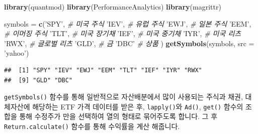 \documentclass[12pt,]{book}
\newenvironment{Shaded}{\begin{snugshade}}{\end{snugshade}}
\newcommand{\CommentTok}[1]{\textcolor[rgb]{0.56,0.35,0.01}{\textit{#1}}}
\newcommand{\ControlFlowTok}[1]{\textcolor[rgb]{0.13,0.29,0.53}{\textbf{#1}}}
\newcommand{\DataTypeTok}[1]{\textcolor[rgb]{0.13,0.29,0.53}{#1}}
\newcommand{\KeywordTok}[1]{\textcolor[rgb]{0.13,0.29,0.53}{\textbf{#1}}}
\newcommand{\NormalTok}[1]{#1}
\newcommand{\OperatorTok}[1]{\textcolor[rgb]{0.81,0.36,0.00}{\textbf{#1}}}
\newcommand{\StringTok}[1]{\textcolor[rgb]{0.31,0.60,0.02}{#1}}
\begin{document}
\begin{Shaded}
\begin{Highlighting}[]
\KeywordTok{library}\NormalTok{(quantmod)}
\KeywordTok{library}\NormalTok{(PerformanceAnalytics)}
\KeywordTok{library}\NormalTok{(magrittr)}

\NormalTok{symbols =}\StringTok{ }\KeywordTok{c}\NormalTok{(}\StringTok{'SPY'}\NormalTok{, }\CommentTok{# 미국 주식}
            \StringTok{'IEV'}\NormalTok{, }\CommentTok{# 유럽 주식 }
            \StringTok{'EWJ'}\NormalTok{, }\CommentTok{# 일본 주식}
            \StringTok{'EEM'}\NormalTok{, }\CommentTok{# 이머징 주식}
            \StringTok{'TLT'}\NormalTok{, }\CommentTok{# 미국 장기채}
            \StringTok{'IEF'}\NormalTok{, }\CommentTok{# 미국 중기채}
            \StringTok{'IYR'}\NormalTok{, }\CommentTok{# 미국 리츠}
            \StringTok{'RWX'}\NormalTok{, }\CommentTok{# 글로벌 리츠}
            \StringTok{'GLD'}\NormalTok{, }\CommentTok{# 금}
            \StringTok{'DBC'}  \CommentTok{# 상품}
\NormalTok{            )}
\KeywordTok{getSymbols}\NormalTok{(symbols, }\DataTypeTok{src =} \StringTok{'yahoo'}\NormalTok{)}
\end{Highlighting}
\end{Shaded}

\begin{verbatim}
##  [1] "SPY" "IEV" "EWJ" "EEM" "TLT" "IEF" "IYR" "RWX"
##  [9] "GLD" "DBC"
\end{verbatim}

\begin{Shaded}
\end{Shaded}

\texttt{getSymbols()} 함수를 통해 일반적으로 자산배분에서 많이 사용되는 주식과 채권, 대체자산에 해당하는 ETF 가격 데이터를 받은 후, \texttt{lapply()}와 \texttt{Ad()}, \texttt{get()} 함수의 조합을 통해 수정주가 만을 선택하여 열의 형태로 묶어주도록 합니다. 그 후 \texttt{Return.calculate()} 함수를 통해 수익률을 계산 해줍니다.
\end{document}
